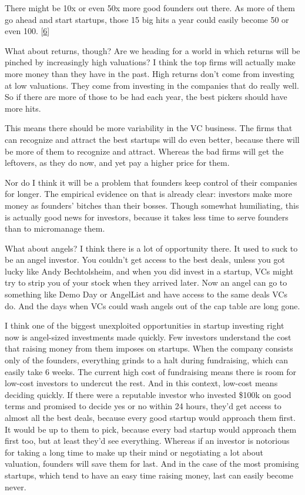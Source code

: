 There might be 10x or even 50x more good founders out there. As more of
them go ahead and start startups, those 15 big hits a year could easily
become 50 or even 100. {[}\hyperref[f6n]{6}{]}

What about returns, though? Are we heading for a world in which returns
will be pinched by increasingly high valuations? I think the top firms
will actually make more money than they have in the past. High returns
don't come from investing at low valuations. They come from investing in
the companies that do really well. So if there are more of those to be
had each year, the best pickers should have more hits.

This means there should be more variability in the VC business. The
firms that can recognize and attract the best startups will do even
better, because there will be more of them to recognize and attract.
Whereas the bad firms will get the leftovers, as they do now, and yet
pay a higher price for them.

Nor do I think it will be a problem that founders keep control of their
companies for longer. The empirical evidence on that is already clear:
investors make more money as founders' bitches than their bosses. Though
somewhat humiliating, this is actually good news for investors, because
it takes less time to serve founders than to micromanage them.

What about angels? I think there is a lot of opportunity there. It used
to suck to be an angel investor. You couldn't get access to the best
deals, unless you got lucky like Andy Bechtolsheim, and when you did
invest in a startup, VCs might try to strip you of your stock when they
arrived later. Now an angel can go to something like Demo Day or
AngelList and have access to the same deals VCs do. And the days when
VCs could wash angels out of the cap table are long gone.

I think one of the biggest unexploited opportunities in startup
investing right now is angel-sized investments made quickly. Few
investors understand the cost that raising money from them imposes on
startups. When the company consists only of the founders, everything
grinds to a halt during fundraising, which can easily take 6 weeks. The
current high cost of fundraising means there is room for low-cost
investors to undercut the rest. And in this context, low-cost means
deciding quickly. If there were a reputable investor who invested \$100k
on good terms and promised to decide yes or no within 24 hours, they'd
get access to almost all the best deals, because every good startup
would approach them first. It would be up to them to pick, because every
bad startup would approach them first too, but at least they'd see
everything. Whereas if an investor is notorious for taking a long time
to make up their mind or negotiating a lot about valuation, founders
will save them for last. And in the case of the most promising startups,
which tend to have an easy time raising money, last can easily become
never.

